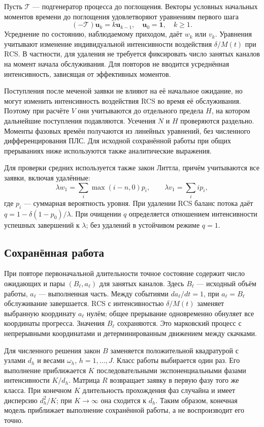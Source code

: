 \documentclass[a4paper,12pt]{article}
\begin{document}
Пусть \(\mathcal T\) --- подгенератор процесса до поглощения. Векторы условных начальных моментов времени до поглощения удовлетворяют уравнениям первого шага
\[
(-\mathcal T)\boldsymbol u_k=k\boldsymbol u_{k-1},\quad
\boldsymbol u_0=\mathbf1,\quad k\ge1.
\]
Усреднение по состоянию, наблюдаемому приходом, даёт \(w_k\) или \(v_k\). Уравнения учитывают изменение индивидуальной интенсивности воздействия \(\delta/M(t)\) при RCS. В частности, для удаления не требуется фиксировать число занятых каналов на момент начала обслуживания. Для повторов не вводится усреднённая интенсивность, зависящая от эффективных моментов.

Поступления после меченой заявки не влияют на её начальное ожидание, но могут изменить интенсивность воздействия RCS во время её обслуживания. Поэтому при расчёте \(V\) они учитываются до отдельного предела \(H\), на котором дальнейшие поступления подавляются. Усечения \(N\) и \(H\) проверяются раздельно. Моменты фазовых времён получаются из линейных уравнений, без численного дифференцирования ПЛС. Для исходной сохранённой работы при общих прерываниях ниже используются также аналитические выражения.

Для проверки средних используется также закон Литтла, причём учитываются все заявки, включая удалённые:
\[
\lambda w_1=\sum_i\max(i-n,0)p_i,\qquad
\lambda v_1=\sum_i i p_i,
\]
где \(p_i\) --- суммарная вероятность уровня. При удалении RCS баланс потока даёт \(q=1-\delta(1-p_0)/\lambda\). При очищении \(q\) определяется отношением интенсивности успешных завершений к \(\lambda\); без удалений в устойчивом режиме \(q=1\).

\subsection{Сохранённая работа}
При повторе первоначальной длительности точное состояние содержит число ожидающих и пары \((B_\ell,a_\ell)\) для занятых каналов. Здесь \(B_\ell\) --- исходный объём работы, \(a_\ell\) --- выполненная часть. Между событиями \(da_\ell/dt=1\), при \(a_\ell=B_\ell\) обслуживание завершается. RCS с интенсивностью \(\delta/M(t)\) заменяет выбранную координату \(a_\ell\) нулём; общее прерывание одновременно обнуляет все координаты прогресса. Значения \(B_\ell\) сохраняются. Это марковский процесс с непрерывными координатами и детерминированным движением между скачками.

Для численного решения закон \(B\) заменяется положительной квадратурой с узлами \(d_h\) и весами \(\omega_h\), \(h=1,\ldots,J\). Класс работы выбирается один раз. Его выполнение приближается \(K\) последовательными экспоненциальными фазами интенсивности \(K/d_h\). Матрица \(R\) возвращает заявку в первую фазу того же класса. При конечном \(K\) длительность прохождения фаз случайна и имеет дисперсию \(d_h^2/K\); при \(K\to\infty\) она сходится к \(d_h\). Таким образом, конечная модель приближает выполнение сохранённой работы, а не воспроизводит его точно.
\end{document}
